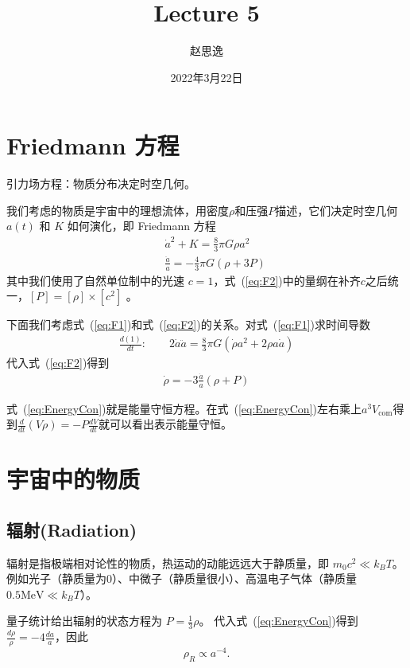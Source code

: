 \documentclass[12pt]{ctexart}
\title{Lecture 5}
\author{赵思逸}
\date{2022年3月22日}
\newcommand{\refeq}[1]{式~(\ref{#1})}
\begin{document}
\maketitle


\section{ Friedmann 方程}

引力场方程：物质分布决定时空几何。

我们考虑的物质是宇宙中的理想流体，用密度$\rho$和压强$P$描述，它们决定时空几何 $a(t)$ 和 $K$ 如何演化，即 Friedmann 方程
\begin{eqnarray}
    &&\dot{a}^2+K = \frac{8}{3} \pi G \rho a^2 \label{eq:adot} \label{eq:F1}\\
    &&\frac{\ddot{a}}{a} = -\frac{4}{3} \pi G (\rho + 3P) \label{eq:F2}
\end{eqnarray}
其中我们使用了自然单位制中的光速 $c=1$，\refeq{eq:F2}中的量纲在补齐$c$之后统一，$[P]=[\rho] \times [c^2]$ 。

下面我们考虑\refeq{eq:F1}和\refeq{eq:F2}的关系。对\refeq{eq:F1}求时间导数
\begin{eqnarray}
    \frac{d(1)}{dt} : \qquad 2\dot{a}\ddot{a} = \frac{8}{3} \pi G (\dot{\rho} a^2 + 2\rho a \dot{a})
\end{eqnarray}
代入\refeq{eq:F2}得到
\begin{eqnarray}
    \dot{\rho} = -3\frac{\dot{a}}{a}(\rho+P) \label{eq:EnergyCon}
\end{eqnarray}

\refeq{eq:EnergyCon}就是能量守恒方程。在\refeq{eq:EnergyCon}左右乘上$a^3 V_\text{com}$得到$\frac{d}{dt}(V\rho) = -P\frac{dV}{dt}$就可以看出表示能量守恒。

\section{宇宙中的物质}

\subsection{辐射(Radiation)}

辐射是指极端相对论性的物质，热运动的动能远远大于静质量，即 $m_0 c^2 \ll k_B T$。
例如光子（静质量为0）、中微子（静质量很小）、高温电子气体（静质量 $0.5 \mathrm{MeV} \ll k_B T$）。

量子统计给出辐射的状态方程为 $P=\frac{1}{3}\rho$。
代入\refeq{eq:EnergyCon}得到 $\frac{d\rho}{\rho} = -4\frac{da}{a}$，因此 
\begin{equation}
    \rho_R\propto a^{-4}.
\end{equation}
\end{document}
